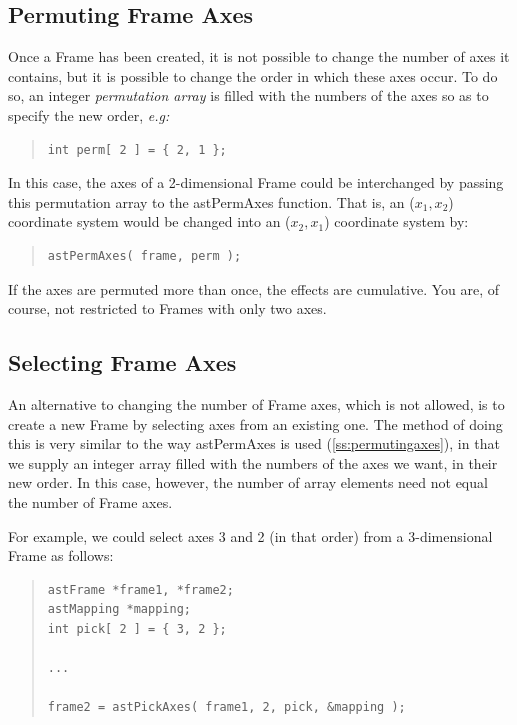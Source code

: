 \documentclass[twoside,11pt]{article}
\newcommand{\htmlref}[2]{#1}
\newcommand{\secref}[1]{\S\ref{#1}}
\renewcommand{\secref}[1]{\ref{#1}}
\begin{document}
\subsection{\label{ss:permutingaxes}Permuting Frame Axes}

Once a \htmlref{Frame}{Frame} has been created, it is not possible to change the number
of axes it contains, but it is possible to change the order in which
these axes occur. To do so, an integer {\em{permutation array}} is
filled with the numbers of the axes so as to specify the new order,
{\em{e.g:}}

\begin{quote}
\small
\begin{verbatim}
int perm[ 2 ] = { 2, 1 };
\end{verbatim}
\normalsize
\end{quote}

In this case, the axes of a 2-dimensional Frame could be interchanged
by passing this permutation array to the \htmlref{astPermAxes}{astPermAxes} function. That
is, an ($x_1,x_2$) coordinate system would be changed into an
($x_2,x_1$) coordinate system by:

\begin{quote}
\small
\begin{verbatim}
astPermAxes( frame, perm );
\end{verbatim}
\normalsize
\end{quote}

If the axes are permuted more than once, the effects are cumulative.
You are, of course, not restricted to Frames with only two axes.

\subsection{Selecting Frame Axes}

An alternative to changing the number of \htmlref{Frame}{Frame} axes, which is not
allowed, is to create a new Frame by selecting axes from an existing
one. The method of doing this is very similar to the way \htmlref{astPermAxes}{astPermAxes}
is used (\secref{ss:permutingaxes}), in that we supply an integer
array filled with the numbers of the axes we want, in their new
order. In this case, however, the number of array elements need not
equal the number of Frame axes.

For example, we could select axes 3 and 2 (in that order) from a
3-dimensional Frame as follows:

\begin{quote}
\small
\begin{verbatim}
astFrame *frame1, *frame2;
astMapping *mapping;
int pick[ 2 ] = { 3, 2 };

...

frame2 = astPickAxes( frame1, 2, pick, &mapping );
\end{verbatim}
\normalsize
\end{quote}
\end{document}
